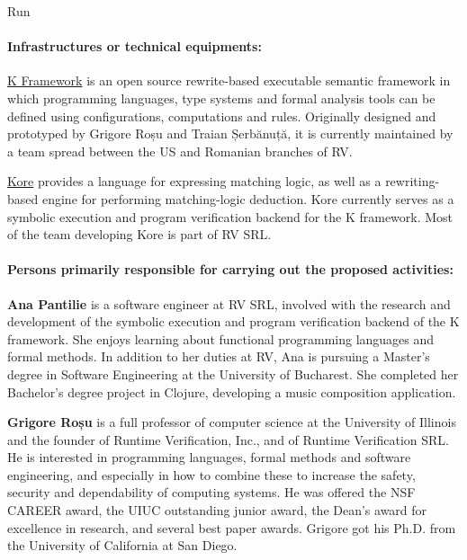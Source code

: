 \begin{sitedescription}{Run}
\paragraph*{Infrastructures or technical equipments:}


\begin{compactitem}
\item \href{https://github.com/kframework/k}{K Framework} is an open source
 rewrite-based executable semantic framework in which programming languages,
 type systems and formal analysis tools can be defined using configurations,
 computations and rules. Originally designed and prototyped by Grigore Roșu and 
 Traian Șerbănuță, it is currently maintained by a team spread between the US and 
 Romanian branches of RV. 
\item \href{https://github.com/kframework/kore}{Kore} provides a language for
expressing matching logic, as well as a rewriting-based engine for performing 
matching-logic deduction.  Kore currently serves as a symbolic execution and 
program verification backend for the K framework. Most of the team developing Kore
is part of RV SRL.
\end{compactitem}

\paragraph*{Persons primarily responsible for carrying out the proposed activities:}

\begin{compactitem} %

\item{\bf Ana Pantilie} is a software engineer at RV SRL, involved with the
research and development of the symbolic execution and program verification
backend of the K framework.
She enjoys learning about functional programming languages and formal methods.
In addition to her duties at RV, Ana is pursuing a Master's degree in Software
Engineering at the University of Bucharest.
She completed her Bachelor's degree project in Clojure, developing a music
composition application.

\item{\bf Grigore Roșu} is a full professor of computer science at the
University of Illinois and the founder of Runtime Verification, Inc., and of 
Runtime Verification SRL. He is interested in programming languages,
formal methods and software engineering, and especially in how to combine
these to increase the safety, security and dependability of computing systems.
He was offered the NSF CAREER award, the UIUC outstanding junior award,
the Dean's award for excellence in research, and several best paper awards.
Grigore got his Ph.D. from the University of California at San Diego.


\end{compactitem}
\end{sitedescription}
